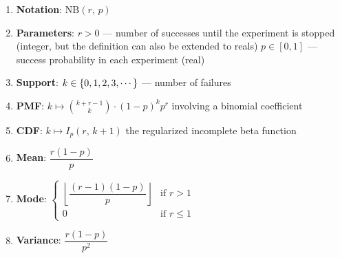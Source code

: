 \begin{enumerate}
    \item \textbf{Notation}:
    $
         {\displaystyle \mathrm {NB} (r,\,p)}
    $
    \hfill \cite{wiki/Negative_binomial_distribution}

    \item \textbf{Parameters}:
    $r > 0$ — number of successes until the experiment is stopped (integer, but the definition can also be extended to reals) $p \in [0, 1]$ — success probability in each experiment (real)
    \hfill \cite{wiki/Negative_binomial_distribution}

    \item \textbf{Support}:
     $k \in \left\{0, 1, 2, 3, \cdots\right\}$ — number of failures
    \hfill \cite{wiki/Negative_binomial_distribution}

    \item \textbf{PMF}:
    ${\displaystyle k\mapsto {k+r-1 \choose k}\cdot (1-p)^{k}p^{r}}$
    involving a binomial coefficient
    \hfill \cite{wiki/Negative_binomial_distribution}

    \item \textbf{CDF}:
    ${\displaystyle k\mapsto I_{p}(r,\,k+1)}$
    the regularized incomplete beta function
    \hfill \cite{wiki/Negative_binomial_distribution}

    \item \textbf{Mean}:
    $
         {\displaystyle {\dfrac {r(1-p)}{p}}}
    $
    \hfill \cite{wiki/Negative_binomial_distribution}


    \item \textbf{Mode}:
    $
         {\displaystyle {\begin{cases}\left\lfloor {\dfrac {(r-1)(1-p)}{p}}\right\rfloor &{\text{if }}r>1\\0&{\text{if }}r\leq 1\end{cases}}}
    $
    \hfill \cite{wiki/Negative_binomial_distribution}

    \item \textbf{Variance}:
    $
         {\displaystyle {\dfrac {r(1-p)}{p^{2}}}}
    $
    \hfill \cite{wiki/Negative_binomial_distribution}



\end{enumerate}
